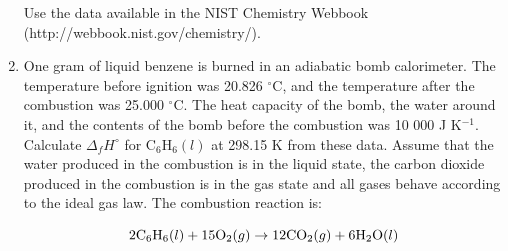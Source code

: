 \begin{enumerate}
Use the data available in the NIST Chemistry Webbook\\
(http://webbook.nist.gov/chemistry/).


\item One gram of liquid benzene is burned in an adiabatic bomb calorimeter. The temperature before ignition was 20.826 $^\circ$C, and the temperature after the combustion was 25.000 $^\circ$C. The heat capacity of the bomb, the water around it, and the contents of the bomb before the combustion was 10 000 J K$^{-1}$. Calculate $\Delta_fH^\circ$ for C$_6$H$_6(l)$ at 298.15 K from these data. Assume that the water produced in the combustion is in the liquid state, the carbon dioxide produced in the combustion is in the gas state and all gases
behave according to the ideal gas law. The combustion reaction is:

$$2\textnormal{C}_6\textnormal{H}_6(l) + 15\textnormal{O}_2(g) \rightarrow 12\textnormal{CO}_2(g) + 6\textnormal{H}_2\textnormal{O}(l)$$


\end{enumerate}
